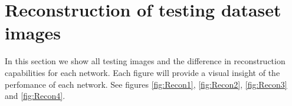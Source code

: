 \begin{table}[!htb]
\caption[Compendium of PSNR for reconstructing networks]{Comparison in PSNR performance for each proposed network.}
\label{tab:summaryPSNR}
\begin{center}
\end{center}
\end{table}

\begin{table}[!htb]
\caption[Compendium of SSIM for reconstructing networks]{Comparison in SSIM performance for each proposed network.}
\label{tab:summarySSIM}
\begin{center}
\end{center}
\end{table}

\FloatBarrier

\section{Reconstruction of testing dataset images}
In this section we show all testing images and the difference in reconstruction capabilities for each network. Each figure will provide a visual insight of the perfomance of each network. See figures \ref{fig:Recon1}, \ref{fig:Recon2}, \ref{fig:Recon3} and \ref{fig:Recon4}.  



